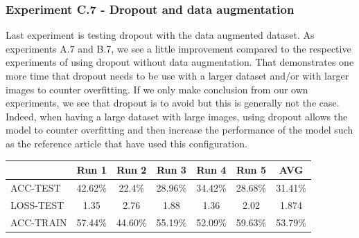 \documentclass[11pt, openany]{report}
\theoremstyle{plain}
\theoremstyle{definition}
\theoremstyle{remark}
\begin{document}
\subsubsection{Experiment C.7 - Dropout and data augmentation}
Last experiment is testing dropout with the data augmented dataset. As experiments A.7 and B.7,  we see a little improvement compared to the respective experiments of using dropout without data augmentation. That demonstrates one more time that dropout needs to be use with a larger dataset and/or with larger images to counter overfitting. If we only make conclusion from our own experiments, we see that dropout is to avoid but this is generally not the case. Indeed, when having a large dataset with large images, using dropout allows the model to counter overfitting and then increase the performance of the model such as the reference article \cite{leukemia} that have used this configuration. 

\begin{center}
\begin{tabular}{|l|c|c|c|c|c|c|}
  \hline
   & \textbf{Run 1} & \textbf{Run 2} & \textbf{Run 3} & \textbf{Run 4} & \textbf{Run 5} & \textbf{AVG}\\
  \hline
  ACC-TEST & 42.62\% & 22.4\% & 28.96\% & 34.42\% & 28.68\% & 31.41\% \\
  LOSS-TEST & 1.35 & 2.76 & 1.88 & 1.36 & 2.02 & 1.874 \\ 
  ACC-TRAIN & 57.44\% & 44.60\% & 55.19\% & 52.09\% & 59.63\% & 53.79\% \\ 
  \hline
\end{tabular}
\label{table:results-C7}
\end{center}
\end{document}
